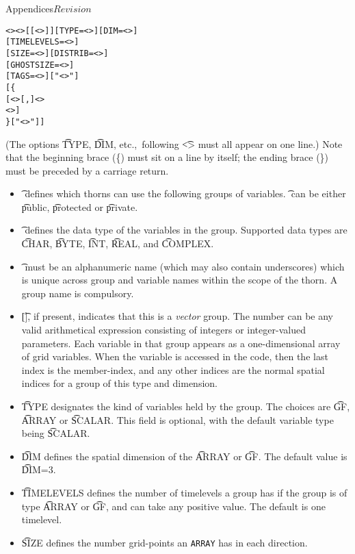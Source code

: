 \begin{cactuspart}{Appendices}{}{$Revision$}
\begin{alltt}
<> <>[[<>]] [TYPE=<>] [DIM=<>]
[TIMELEVELS=<>]
[SIZE=<>] [DISTRIB=<>]
[GHOSTSIZE=<>]
[TAGS=<>]  ["<>"]
[\{
 [ <>[,]<>
   <> ]
\} ["<>"] ]
\end{alltt}
%
(The options {\t TYPE}, {\t DIM}, etc.,\ following {\t <>}
must all appear on one line.)  Note that the beginning brace (\{) must
sit on a line by itself; the ending brace (\}) must be preceded by a
carriage return.
%
\begin{itemize}
\item{} {\t {}} defines which thorns can use the following
        groups of variables. {\t {}} can be either
        {\t public}, {\t protected} or {\t private}.
\item{} {\t {}} defines the data type of the variables in the
group.  Supported data types are {\t CHAR}, {\t BYTE}, {\t INT}, {\t REAL}, and
{\t COMPLEX}. 
\item{} {\t {}} must be an alphanumeric name (which may also
contain underscores) which is unique across group and variable names
within the scope of the thorn. A group name is compulsory.
\item{} {\t []}, if present, indicates that this is a
  \emph{vector} group.  The number can be any valid arithmetical
  expression consisting of integers or integer-valued parameters.
  Each variable in that group appears as a one-dimensional array of
  grid variables.  When the variable is accessed in the code, then the
  last index is the member-index, and any other indices are the normal
  spatial indices for a group of this type and dimension.
\item{} {\t TYPE} designates the kind of variables held by the group.
The choices are {\t GF}, {\t ARRAY} or {\t SCALAR}. This field is
optional, with the default variable type being {\t SCALAR}.
\item{} {\t DIM} defines the spatial dimension of the {\t ARRAY} or
{\t GF}.  The default value is {\t DIM=3}.
\item{} {\t TIMELEVELS} defines the number of timelevels a group has if
        the group is of type {\t ARRAY} or {\t GF}, and can take any positive
        value. The default is one timelevel.
\item{} {\t SIZE} defines the number grid-points an {\tt ARRAY} has in each direction.

\end{itemize}
\end{cactuspart}
